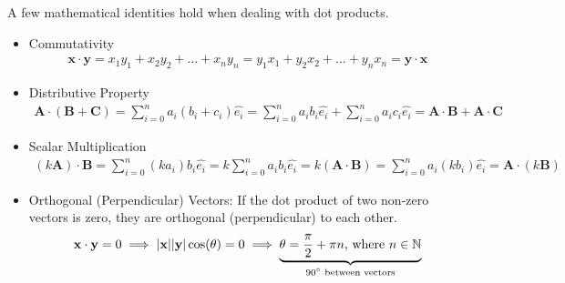 A few mathematical identities hold when dealing with dot products.

\begin{itemize}
	\item Commutativity
	\begin{align}
		\mathbf{x}\cdot\mathbf{y} = x_1y_1 + x_2y_2 + \hdots + x_ny_n = y_1x_1 + y_2x_2 + \hdots + y_nx_n = \mathbf{y}\cdot\mathbf{x}
	\end{align}
	\item Distributive Property
	\begin{align}
		 \mathbf{A} \cdot (\mathbf{B} + \mathbf{C}) = \sum_{i=0}^{n}a_i(b_i+c_i)\hat{e_i} = \sum_{i=0}^{n}a_ib_i\hat{e_i} + \sum_{i=0}^{n}a_ic_i\hat{e_i} = \mathbf{A} \cdot \mathbf{B} + \mathbf{A} \cdot \mathbf{C}
	\end{align}
	\item Scalar Multiplication
	\begin{align}
		(k\mathbf{A}) \cdot \mathbf{B} = \sum_{i=0}^{n}(ka_i)b_i\hat{e_i} = k\sum_{i=0}^{n}a_ib_i\hat{e_i} = k(\mathbf{A} \cdot \mathbf{B}) = \sum_{i=0}^{n}a_i(kb_i)\hat{e_i}= \mathbf{A} \cdot (k\mathbf{B})
	\end{align}
	\item Orthogonal (Perpendicular) Vectors: If the dot product of two non-zero vectors is zero, they are orthogonal (perpendicular) to each other.
	\begin{align}
		\mathbf{x}\cdot\mathbf{y} = 0 \implies  |\mathbf{x}||\mathbf{y}|\cos(\theta) = 0 \implies \underbrace{\theta = \frac{\pi}{2}+\pi n\text{, where } n\in {\mathbb N}}_{\text{$90^\circ$ between vectors}}
	\end{align}
\end{itemize}


